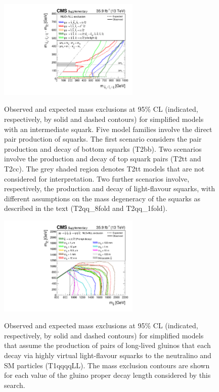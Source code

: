 \clearpage
\begin{figure}[!t]
  \centering
  \includegraphics[width=0.6\textwidth]{Supplementary/CMS-SUS-16-038_Figure-aux_024}\\
  \caption{Observed and expected mass exclusions at 95\% CL
    (indicated, respectively, by solid and dashed contours) for
    simplified models with an intermediate squark.
    Five model families involve the direct pair
    production of squarks. The first scenario considers the pair
    production and decay of bottom squarks (T2bb). Two
    scenarios involve the production and decay of top squark pairs
    (T2tt and T2cc). The grey shaded region denotes
    T2tt models that are not considered for
    interpretation. Two further scenarios involve, respectively, the 
    production and decay of light-flavour squarks, with different
    assumptions on the mass degeneracy of the squarks as described in
    the text (T2qq\_8fold and T2qq\_1fold).}
  \label{fig:limits-sms_aux_squarks} 
\end{figure}

\clearpage
\begin{figure}[!t]
  \centering
  \includegraphics[width=0.6\textwidth]{Supplementary/CMS-SUS-16-038_Figure-aux_025}\\
  \caption{Observed and expected mass exclusions at 95\% CL
    (indicated, respectively, by solid and dashed contours) for
    simplified models that assume the production of pairs of
    long-lived gluinos that each decay via highly virtual
    light-flavour squarks to the neutralino and SM particles
    (T1qqqqLL). The mass exclusion contours are shown for each 
    value of the gluino proper decay length \ctau considered by this
    search. }
  \label{fig:limits-sms_aux_long_lived} 
\end{figure}

